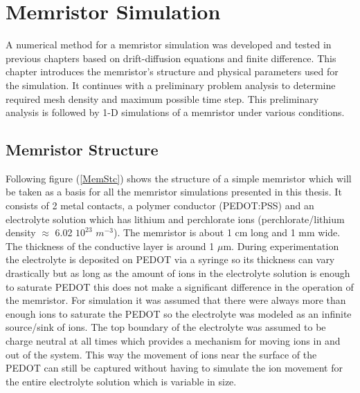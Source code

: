 
\chapter{Memristor Simulation} %

\label{Chapter5} %


A numerical method for a memristor simulation was developed and tested in previous chapters based on drift-diffusion equations and finite difference. This chapter introduces the memristor's structure and physical parameters used for the simulation. It continues with a preliminary problem analysis to determine required mesh density and maximum possible time step. This preliminary analysis is followed by 1-D simulations of a memristor under various conditions.

\section{Memristor Structure}
Following figure (\ref{MemStc}) shows the structure of a simple memristor which will be taken as a basis for all the memristor simulations presented in this thesis. It consists of 2 metal contacts, a polymer conductor (PEDOT:PSS) and an electrolyte solution which has lithium and perchlorate ions (perchlorate/lithium density $\approx$ 6.02 $10^{23}$ $m^{-3}$). The memristor is about 1 cm long and 1 mm wide. The thickness of the conductive layer is around 1 $\mu$m. During experimentation the electrolyte is deposited on PEDOT via a syringe so its thickness can vary drastically but as long as the amount of ions in the electrolyte solution is enough to saturate PEDOT this does not make a significant difference in the operation of the memristor. For simulation it was assumed that there were always more than enough ions to saturate the PEDOT so the electrolyte was modeled as an infinite source/sink of ions. The top boundary of the electrolyte was assumed to be charge neutral at all times which provides a mechanism for moving ions in and out of the system. This way the movement of ions near the surface of the PEDOT can still be captured without having to simulate the ion movement for the entire electrolyte solution which is variable in size. 

